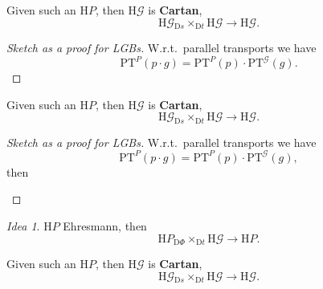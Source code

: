 \documentclass[
aspectratio=3218, 
10pt
]{beamer}
\newcommand\fibtimes[2]{\mathbin{_{#1}\times_{#2}}}
\def\bes{\begin{equation*}}
\def\ees{\end{equation*}}
\theoremstyle{plain}
\theoremstyle{remark}
\newtheorem*{idea}{Idea}
\begin{document}
{\begin{frame}
\begin{theorem}\vspace{.5pt}
Given such an $\mathup{H}P$, then $\mathup{H}\mathcal{G}$ is \textbf{Cartan},
\bes
\mathup{H}\mathcal{G} \fibtimes{\mathup{D}s}{\mathup{D}t} \mathup{H}\mathcal{G}
\to 
\mathup{H}\mathcal{G}.
\ees
\end{theorem}
\pause
\begin{proof}[Sketch as a proof for LGBs]\vspace{.5pt}
W.r.t.\ parallel transports we have
\bes
\mathup{PT}^P(p\cdot g) = \mathup{PT}^P(p) \cdot \mathup{PT}^{\mathcal{G}}(g).
\ees
\end{proof}
\end{frame}

\begin{frame}
\begin{theorem}\vspace{.5pt}
Given such an $\mathup{H}P$, then $\mathup{H}\mathcal{G}$ is \textbf{Cartan},
\bes
\mathup{H}\mathcal{G} \fibtimes{\mathup{D}s}{\mathup{D}t} \mathup{H}\mathcal{G}
\to 
\mathup{H}\mathcal{G}.
\ees
\end{theorem}

\begin{proof}[Sketch as a proof for LGBs]\vspace{.5pt}
W.r.t.\ parallel transports we have
\bes
\mathup{PT}^P(p\cdot g) = \mathup{PT}^P(p) \cdot \mathup{PT}^{\mathcal{G}}(g),
\ees
then
\begin{center}
\end{center}
\end{proof}
\end{frame}

\begin{frame}
\begin{idea}
$\mathup{H}P$ Ehresmann, then
\bes
\mathup{H}P \fibtimes{\mathup{D}\Phi}{\mathup{D}t} \mathup{H}\mathcal{G}
\to 
\mathup{H}P.
\ees
\end{idea}

\begin{theorem}\vspace{.5pt}
Given such an $\mathup{H}P$, then $\mathup{H}\mathcal{G}$ is \textbf{Cartan},
\bes
\mathup{H}\mathcal{G} \fibtimes{\mathup{D}s}{\mathup{D}t} \mathup{H}\mathcal{G}
\to 
\mathup{H}\mathcal{G}.
\ees
\end{theorem}


\end{frame}}
\end{document}
